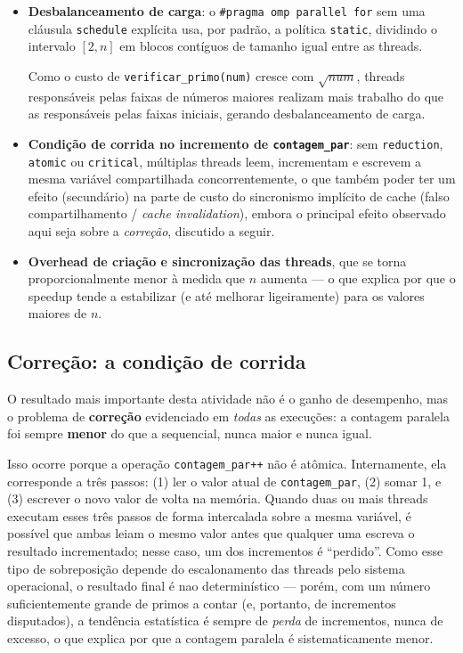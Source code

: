 \documentclass[a4paper,12pt]{article}
\begin{document}
\begin{itemize}
    \item \textbf{Desbalanceamento de carga}: o \texttt{\#pragma omp parallel for} sem uma
    cláusula \texttt{schedule} explícita usa, por padrão, a política \texttt{static},
    dividindo o intervalo $[2, n]$ em blocos contíguos de tamanho igual entre as threads.
    
    Como o custo de \texttt{verificar\_primo(num)} cresce com $\sqrt{num}$, threads
    responsáveis pelas faixas de números maiores realizam mais trabalho do que as
    responsáveis pelas faixas iniciais, gerando desbalanceamento de carga.
    
    \item \textbf{Condição de corrida no incremento de \texttt{contagem\_par}}: sem
    \texttt{reduction}, \texttt{atomic} ou \texttt{critical}, múltiplas threads leem,
    incrementam e escrevem a mesma variável compartilhada concorrentemente, o que também
    poder ter um efeito (secundário) na parte de custo do sincronismo implícito de cache
    (falso compartilhamento / \textit{cache invalidation}), embora o principal efeito
    observado aqui seja sobre a \emph{correção}, discutido a seguir.
    
    \item \textbf{Overhead de criação e sincronização das threads}, que se torna
    proporcionalmente menor à medida que $n$ aumenta — o que explica por que o speedup
    tende a estabilizar (e até melhorar ligeiramente) para os valores maiores de $n$.
\end{itemize}

\subsection{Correção: a condição de corrida}

O resultado mais importante desta atividade não é o ganho de desempenho, mas o problema de
\textbf{correção} evidenciado em \emph{todas} as execuções: a contagem paralela foi sempre
\textbf{menor} do que a sequencial, nunca maior e nunca igual.

Isso ocorre porque a operação \texttt{contagem\_par++} não é atômica. Internamente, ela
corresponde a três passos: (1) ler o valor atual de \texttt{contagem\_par}, (2) somar 1,
e (3) escrever o novo valor de volta na memória. Quando duas ou mais threads executam
esses três passos de forma intercalada sobre a mesma variável, é possível que ambas leiam
o mesmo valor antes que qualquer uma escreva o resultado incrementado; nesse caso, um dos
incrementos é ``perdido''. Como esse tipo de sobreposição depende do escalonamento das
threads pelo sistema operacional, o resultado final é nao determinístico — porém, com um
número suficientemente grande de primos a contar (e, portanto, de incrementos disputados),
a tendência estatística é sempre de \emph{perda} de incrementos, nunca de excesso, o que
explica por que a contagem paralela é sistematicamente menor.
\end{document}
